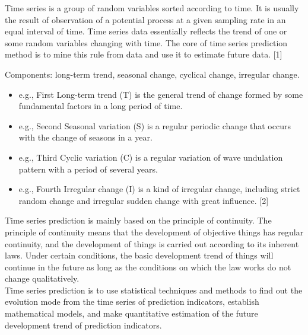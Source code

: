 {}
Time series is a group of random variables sorted according to time. It is usually the result of observation of a potential process at a given sampling rate in an equal interval of time. Time series data essentially reflects the trend of one or some random variables changing with time. The core of time series prediction method is to mine this rule from data and use it to estimate future data. [1]

Components: long-term trend, seasonal change, cyclical change, irregular change.


\begin{itemize}
	\item e.g., First Long-term trend (T) is the general trend of change formed by some fundamental factors in a long period of time.
	\item e.g., Second Seasonal variation (S) is a regular periodic change that occurs with the change of seasons in a year.
	\item e.g., Third Cyclic variation (C) is a regular variation of wave undulation pattern with a period of several years.
	\item e.g., Fourth Irregular change (I) is a kind of irregular change, including strict random change and irregular sudden change with great influence. [2]
\end{itemize}
	Time series prediction is mainly based on the principle of continuity. The principle of continuity means that the development of objective things has regular continuity, and the development of things is carried out according to its inherent laws. Under certain conditions, the basic development trend of things will continue in the future as long as the conditions on which the law works do not change qualitatively.
\\
	Time series prediction is to use statistical techniques and methods to find out the evolution mode from the time series of prediction indicators, establish mathematical models, and make quantitative estimation of the future development trend of prediction indicators.




